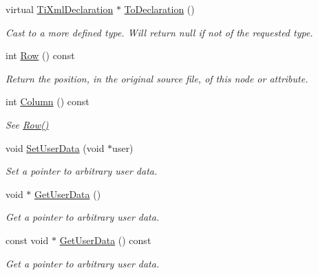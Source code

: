 \begin{DoxyCompactItemize}
virtual \hyperlink{classTiXmlDeclaration}{TiXmlDeclaration} $\ast$ \hyperlink{classTiXmlNode_a4027136ca820ff4a636b607231b6a6df}{ToDeclaration} ()
\begin{DoxyCompactList}\small\item\em Cast to a more defined type. Will return null if not of the requested type. \item\end{DoxyCompactList}\item 
int \hyperlink{classTiXmlBase_a024bceb070188df92c2a8d8852dd0853}{Row} () const 
\begin{DoxyCompactList}\small\item\em Return the position, in the original source file, of this node or attribute. \item\end{DoxyCompactList}\item 
int \hyperlink{classTiXmlBase_ab54bfb9b70fe6dd276e7b279cab7f003}{Column} () const 
\begin{DoxyCompactList}\small\item\em See \hyperlink{classTiXmlBase_a024bceb070188df92c2a8d8852dd0853}{Row()} \item\end{DoxyCompactList}\item 
void \hyperlink{classTiXmlBase_ac6b3e0f790930d4970ec30764e937b5d}{SetUserData} (void $\ast$user)
\begin{DoxyCompactList}\small\item\em Set a pointer to arbitrary user data. \item\end{DoxyCompactList}\item 
void $\ast$ \hyperlink{classTiXmlBase_a6559a530ca6763fc301a14d77ed28c17}{GetUserData} ()
\begin{DoxyCompactList}\small\item\em Get a pointer to arbitrary user data. \item\end{DoxyCompactList}\item 
const void $\ast$ \hyperlink{classTiXmlBase_ad0120210e4680ef2088601753ce0ede4}{GetUserData} () const 
\begin{DoxyCompactList}\small\item\em Get a pointer to arbitrary user data. \item\end{DoxyCompactList}\end{DoxyCompactItemize}
